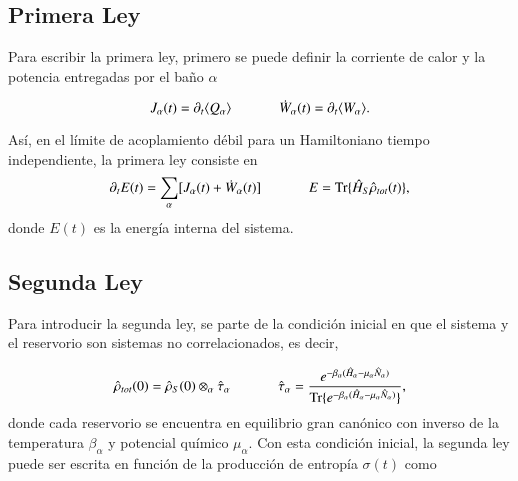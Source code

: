 \subsection{Primera Ley}
Para escribir la primera ley, primero se puede definir la corriente de calor y la potencia entregadas por el baño $\alpha$

\begin{equation*}
    J_{\alpha}(t) = \partial_{t}\langle Q_{\alpha}\rangle \hspace{12mm}  \dot{W}_{\alpha}(t) = \partial_{t}\langle W_{\alpha}\rangle.
\end{equation*}

Así, en el límite de acoplamiento débil para un Hamiltoniano tiempo independiente, la primera ley consiste en 
\begin{equation*}
    \partial_{t}E(t) = \sum_{\alpha}[J_{\alpha}(t) + \dot{W}_{\alpha}(t) ] \hspace{12mm} E = \text{Tr}\{\hat{H}_{S}\hat{\rho}_{tot}(t) \},
\end{equation*}
donde $E(t)$ es la energía interna del sistema.


\subsection{Segunda Ley}
Para introducir la segunda ley, se parte de la condición inicial en que el sistema y el reservorio son sistemas no correlacionados, es decir, 

\begin{equation*}
    \hat{\rho}_{tot}(0) = \hat{\rho}_{S}(0)\otimes_{\alpha}\hat{\tau}_{\alpha} \hspace{12mm} \hat{\tau}_{\alpha} = \frac{e^{-\beta_{\alpha}(\hat{H}_{\alpha}-\mu_{\alpha}\hat{N}_{\alpha}) }}{ \text{Tr}\{e^{-\beta_{\alpha}(\hat{H}_{\alpha} - \mu_{\alpha}\hat{N}_{\alpha})}\} },
\end{equation*}
donde cada reservorio se encuentra en equilibrio gran canónico con inverso de la temperatura $\beta_{\alpha}$ y potencial químico $\mu_{\alpha}$. Con esta condición inicial, la segunda ley puede ser escrita en función de la producción de entropía $\sigma(t)$ como \cite{esposito2010entropy}

